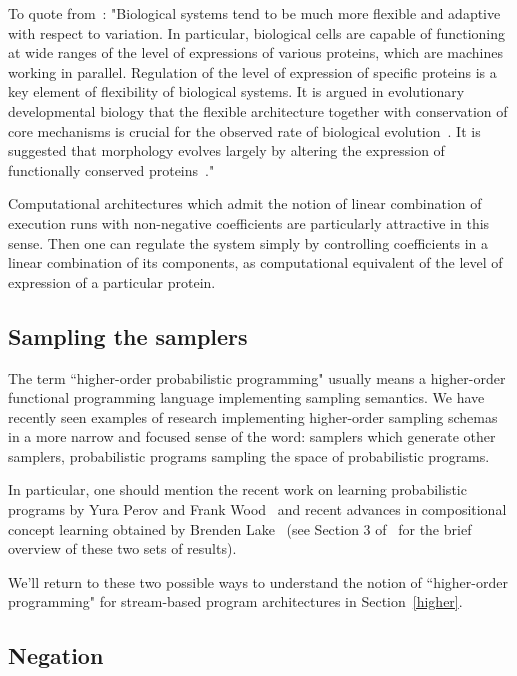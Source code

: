 \documentclass{llncs}
\begin{document}
To quote from~\cite{MBukatinMatthews}: "Biological systems tend to be much more flexible and adaptive with respect to variation. In particular, biological cells are capable of functioning
at wide ranges of the level of expressions of various proteins, which are machines working in parallel. Regulation of the level of expression
of specific proteins is a key element of flexibility of biological systems. It is argued in evolutionary developmental biology
that the flexible architecture together with conservation of core mechanisms is crucial for the observed rate of 
biological evolution~\cite{JGerhartKirschner,MKirschnerGerhart}.
It is suggested that morphology evolves largely by altering the expression of functionally conserved proteins~\cite{SCarrol}."

Computational architectures which admit the notion of linear combination of execution runs with non-negative coefficients are particularly attractive in this sense. 
Then one can regulate the system simply by controlling coefficients in a linear combination of its components,  as
computational equivalent of the level of expression of a particular protein. 

\subsection{Sampling the samplers}\label{sampling_the_samplers}

The term ``higher-order probabilistic programming" usually means a higher-order functional
programming language implementing sampling semantics. We have recently seen examples of research
implementing higher-order sampling schemas in a more narrow and focused sense of the word:
samplers which generate other samplers, probabilistic programs sampling the space of
probabilistic programs. 

In particular, one should mention 
the recent work on learning probabilistic programs by Yura Perov and Frank Wood~\cite{YPerovWood}
and recent advances in compositional concept learning obtained by Brenden Lake~\cite{BLake} (see Section 3 of~\cite{MBukatinMatthews}  for the brief
overview of these two sets of results).

We'll return to these two possible ways to understand the notion of ``higher-order programming"
for stream-based program architectures in Section~\ref{higher}.


\subsection{Negation}
\end{document}
